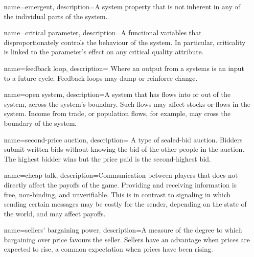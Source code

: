 {
name=emergent,
description={A system property that is not inherent in any of the individual parts of the system. %
}
}

{
name=critical parameter,
description={A functional variables that disproportionately controls the behaviour of the system. In particular, criticality is linked to the parameter's effect on any critical quality attribute. %
}
}

{
name=feedback loop,
description={%
Where an output from a systems is an input to a future cycle. Feedback loops may damp or reinforce change.}
}

{
name=open system,
description={A %
system that has flows into or out of the system, across the system's boundary. %
Such flows may affect stocks or flows in the system. Income from trade, or population flows, for example, may cross the boundary of the system.}
}

{
name=second-price auction,
description={%
A type of sealed-bid auction. Bidders submit written bids without knowing the bid of the other people in the auction. The highest bidder wins but the price paid is the second-highest bid.}
}

{
name=cheap talk,
description={Communication between players that does not directly affect the payoffs of the game. Providing and receiving information is free, non-binding, and unverifiable. This is in contrast to signaling in which sending certain messages may be costly for the sender, depending on the state of the world, and may affect payoffs.}
}

{
name=sellers' bargaining power,
description={A measure of the degree to which bargaining over price favours the seller. Sellers have an advantage when prices are expected to rise, a common expectation when prices have been rising.}
}

